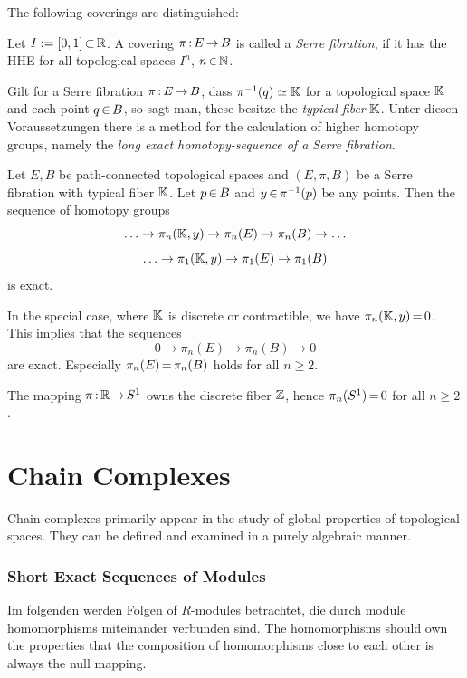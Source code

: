 \documentclass[11pt,twoside]{article}
\def\E{E}
\def\B{B}
\begin{document}
\subparagraph{}
The following coverings are distinguished:

\begin{definition}
Let $I:=[0,1] {\,\subset\,} {\mathbb{R}}$.
A covering $\pi \:\E \xto \B$ is called a \textit{Serre fibration},
if it has the HHE for all topological spaces $I^n$, $n {\,\in\,} {\mathbb{N}}$.
\end{definition}

\subparagraph{}
Gilt for a Serre fibration $\pi \: \E \xto \B$,
dass $\pi^{-1}(q) \simeq {\mathbb{K}}$ for a topological space ${\mathbb{K}}$ and each point
$q \xeof \B$,
so sagt man, these besitze the \textit{typical fiber} ${\mathbb{K}}$.
Unter diesen Voraussetzungen there is a method for the calculation
of higher homotopy groups,
namely the \textit{long exact homotopy-sequence of a Serre fibration}.

\begin{theorem1}
Let $\E,\B$ be path-connected topological spaces and
$(\E,\pi,\B)$ be a Serre fibration with typical fiber ${\mathbb{K}}$.
Let $p \xeof \B$ and $y {\,\in\,} \pi^{-1}(p)$ be any points.
Then the sequence of homotopy groups
\[
\ldots \rightarrow \pi_n(\F,y) \rightarrow \pi_n(\E)
       \rightarrow \pi_n(\B)   \rightarrow
\ldots
\]
\[
\ldots \rightarrow \pi_1(\F,y) \rightarrow \pi_1(\E)
       \rightarrow \pi_1(\B)
\]
is exact.
\end{theorem1}

\subparagraph{}
In the special case,
where ${\mathbb{K}}$ is discrete or contractible,
we have $\pi_n({\mathbb{K}},y) {\,=\,} 0$.
This implies that the sequences
\[
0 \rightarrow \pi_n(\E) \rightarrow \pi_n(\B) \rightarrow 0
\]
are exact.
Especially $\pi_n(\E) \eq \pi_n(\B)$ holds for all $n \geq 2$.

\begin{example}
The mapping $\pi {\,:\,} {\mathbb{R}} {\,\to\,} S^1$ owns the discrete fiber ${\mathbb{Z}}$,
hence $\pi_n(S^1) {\,=\,} 0$ for all $n \geq 2$.
\end{example}

\part{Chain Complexes}
Chain complexes primarily appear in the study of global properties
of topological spaces.
They can be defined and examined in a purely algebraic manner.

\section{Short Exact Sequences of Modules}
Im folgenden werden Folgen of $R$-modules betrachtet,
die durch module homomorphisms miteinander verbunden sind. 
The homomorphisms should own the properties 
that the composition of homomorphisms close to each other is always
the null mapping.
\end{document}
